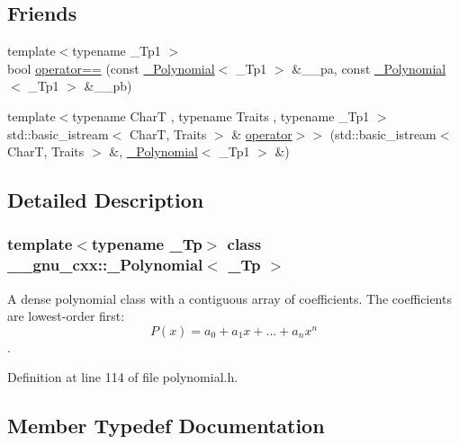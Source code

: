 \subsection*{Friends}
\begin{DoxyCompactItemize}
\item 
{\footnotesize template$<$typename \+\_\+\+Tp1 $>$ }\\bool \hyperlink{class____gnu__cxx_1_1__Polynomial_abb21e2bfe0dc97a44ae9eeffb6f930aa}{operator==} (const \hyperlink{class____gnu__cxx_1_1__Polynomial}{\+\_\+\+Polynomial}$<$ \+\_\+\+Tp1 $>$ \&\+\_\+\+\_\+pa, const \hyperlink{class____gnu__cxx_1_1__Polynomial}{\+\_\+\+Polynomial}$<$ \+\_\+\+Tp1 $>$ \&\+\_\+\+\_\+pb)
\item 
{\footnotesize template$<$typename CharT , typename Traits , typename \+\_\+\+Tp1 $>$ }\\std\+::basic\+\_\+istream$<$ CharT, Traits $>$ \& \hyperlink{class____gnu__cxx_1_1__Polynomial_a929d1753cc00510f102f61a2bbeb0d2d}{operator$>$$>$} (std\+::basic\+\_\+istream$<$ CharT, Traits $>$ \&, \hyperlink{class____gnu__cxx_1_1__Polynomial}{\+\_\+\+Polynomial}$<$ \+\_\+\+Tp1 $>$ \&)
\end{DoxyCompactItemize}


\subsection{Detailed Description}
\subsubsection*{template$<$typename \+\_\+\+Tp$>$\newline
class \+\_\+\+\_\+gnu\+\_\+cxx\+::\+\_\+\+Polynomial$<$ \+\_\+\+Tp $>$}

A dense polynomial class with a contiguous array of coefficients. The coefficients are lowest-\/order first\+: \[ P(x) = a_0 + a_1 x + ... + a_n x^n \]. 

Definition at line 114 of file polynomial.\+h.



\subsection{Member Typedef Documentation}
\mbox{\label{class____gnu__cxx_1_1__Polynomial_a96e4523cc2a834724fe4224f0800486b}} 
